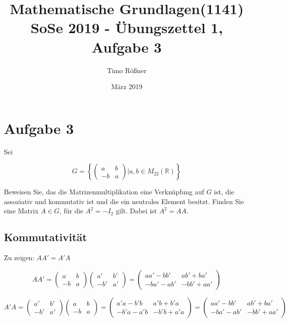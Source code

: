 \documentclass{article}
\title{Mathematische Grundlagen(1141) SoSe 2019 - Übungszettel 1, Aufgabe 3}
\author{Timo Rößner }
\date{März 2019}
\begin{document}
\maketitle

\section*{Aufgabe 3}

Sei

\[
G=
\left\{
  \begin{pmatrix}
    a & b \\
    -b & a
  \end{pmatrix}
| a,b \in M_{22}(\mathbb{R})
\right\}
\]

Beweisen Sie, das die Matrizenmultiplikation eine Verknüpfung auf \(G\) ist, die assoziativ und kommutativ ist und die ein neutrales Element
besitzt. Finden Sie eine Matrix \(A \in G\), für die \(A^2=-I_{2}\) gilt. Dabei ist \(A^2=AA\).

\subsection*{Kommutativität}

Zu zeigen: \(AA'=A'A\)

\[
AA'=
  \begin{pmatrix}
    a & b \\
    -b & a
  \end{pmatrix}
  \begin{pmatrix}
    a' & b' \\
    -b' & a'
  \end{pmatrix}
  =
  \begin{pmatrix}
    aa'-bb'    & ab' + ba' \\
    -ba' - ab' & -bb' + aa'
  \end{pmatrix}
\]

\[
A'A=
  \begin{pmatrix}
    a' & b' \\
    -b' & a'
  \end{pmatrix}
  \begin{pmatrix}
    a & b \\
    -b & a
  \end{pmatrix}
  =
  \begin{pmatrix}
    a'a - b'b  & a'b + b'a \\
    -b'a - a'b & -b'b + a'a
  \end{pmatrix}
  =
  \begin{pmatrix}
    aa' - bb'  & ab' + ba' \\
    -ba' -ab'  & -bb' + aa'
  \end{pmatrix}
\]
\end{document}
